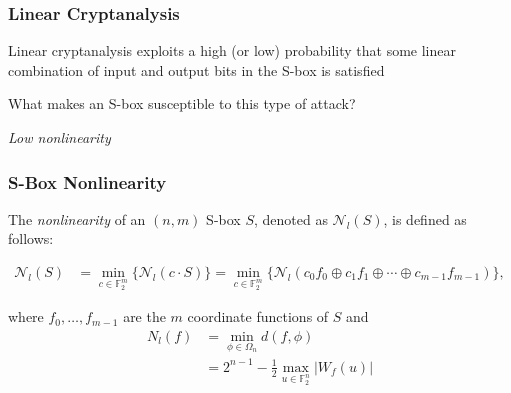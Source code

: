 \documentclass[10pt]{beamer}
\begin{document}
\begin{frame}
	\frametitle{Linear Cryptanalysis}
	Linear cryptanalysis exploits a high (or low) probability that some linear combination of input and output bits in the S-box is satisfied

	\medskip
	\pause

	What makes an S-box susceptible to this type of attack?

	\pause 
	\medskip

	\begin{center}
		\emph{Low nonlinearity}
	\end{center}


\end{frame}



\begin{frame}
	\frametitle{S-Box Nonlinearity}
	The \emph{nonlinearity} of an $(n, m)$ S-box $S$, denoted as $\mathcal{N}_l(S)$, is defined as follows:

	\begin{align*}
		\mathcal{N}_l(S) & = \min_{c \in \mathbb{F}_2^m}\{\mathcal{N}_l(c \cdot S)\} = \min_{c \in \mathbb{F}_2^m}\{\mathcal{N}_l(c_0f_0 \oplus c_1f_1 \oplus \dotsb \oplus c_{m-1}f_{m-1})\},
	\end{align*}
	
	\medskip

	where $f_0,\dots,f_{m-1}$ are the $m$ coordinate functions of $S$ and 
	\begin{align*}
		N_l(f) & = \min_{\phi \in \Omega_n} d(f, \phi)\\
		& = 2^{n-1} - \frac{1}{2}\max_{u \in \mathbb{F}_2^n}|W_f(u)|
	\end{align*}
\end{frame}

\end{document}
